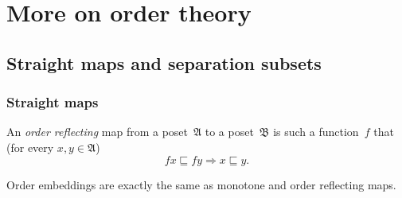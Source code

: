
\chapter{More on order theory}


\section{Straight maps and separation subsets}


\subsection{Straight maps}
\begin{defn}
An \emph{order reflecting} map from a poset~$\mathfrak{A}$ to a poset~$\mathfrak{B}$
is such a function~$f$ that (for every $x,y\in\mathfrak{A}$)
\[ fx\sqsubseteq fy \Rightarrow x\sqsubseteq y. \]
\end{defn}

\begin{obvious}
Order embeddings are exactly the same as monotone and order reflecting maps.
\end{obvious}

